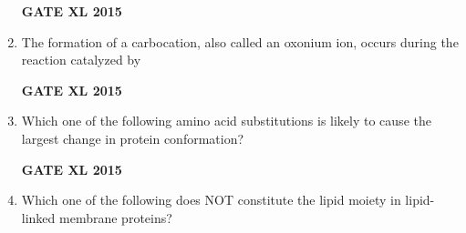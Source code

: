 \documentclass[journal,12pt,onecolumn]{IEEEtran}
\begin{document}
\begin{enumerate}
    \begin{enumerate}
    \end{enumerate}
\hfill{\textbf{GATE XL 2015}}
\item The formation of a carbocation, also called an oxonium ion, occurs during the reaction catalyzed by
    \begin{enumerate}
    \end{enumerate}
\hfill{\textbf{GATE XL 2015}}
\item Which one of the following amino acid substitutions is likely to cause the largest change in protein conformation?
    \begin{enumerate}
    \end{enumerate}
\hfill{\textbf{GATE XL 2015}}
\item Which one of the following does NOT constitute the lipid moiety in lipid-linked membrane proteins?
        \begin{enumerate} 
	\end{enumerate}

\end{enumerate}
\end{document}

